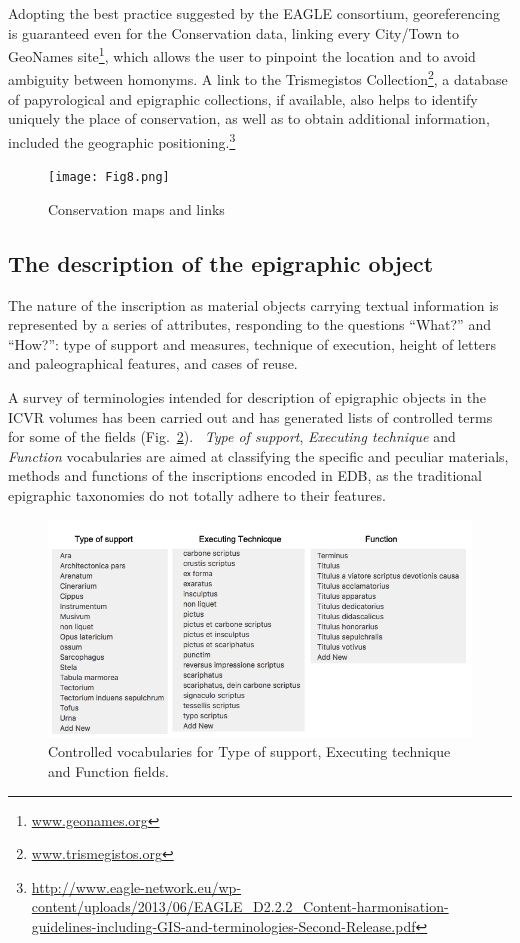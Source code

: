 \documentclass[amsthm,ebook]{saparticle}
\begin{document}
Adopting the best practice suggested by the EAGLE consortium, georeferencing is guaranteed even for the Conservation
data, linking every City/Town to GeoNames site\footnote{ \url{www.geonames.org}}, which allows the user to pinpoint the
location and to avoid ambiguity between homonyms. A link to the Trismegistos Collection\footnote{
\url{www.trismegistos.org}}, a database of papyrological and epigraphic collections, if available, also helps to identify
uniquely the place of conservation, as well as to obtain additional information, included the geographic
positioning.\footnote{\url{http://www.eagle-network.eu/wp-content/uploads/2013/06/EAGLE\_D2.2.2\_Content-harmonisation-guidelines-including-GIS-and-terminologies-Second-Release.pdf}}

\begin{figure}[!hbp]
\centering
 \texttt{[image: Fig8.png]}
\caption{Conservation maps and links}
\label{fig:8new}
\end{figure}



\subsection{The description of the epigraphic object }


The nature of the inscription as material objects carrying textual information is represented by a series of attributes,
responding to the questions “What?” and “How?”: type of support and measures, technique of execution, height of letters
and paleographical features, and cases of reuse.

A survey of terminologies intended for description of epigraphic objects in the ICVR volumes has been carried out and
has generated lists of controlled terms for some of the fields (Fig.~\ref{fig:8}). \ \emph{Type of support}, \emph{Executing technique} and
\emph{Function} vocabularies are aimed at classifying the specific and peculiar materials, methods and functions of the
inscriptions encoded in EDB, as the traditional epigraphic taxonomies do not totally adhere to their features.

\begin{figure}[hbp]
\centering
 \includegraphics[width=\columnwidth]{EAGLE2016Roccoengrev-img008.png}
\caption{Controlled vocabularies for Type of support, Executing technique and Function fields.}
\label{fig:8}
\end{figure}
\end{document}
